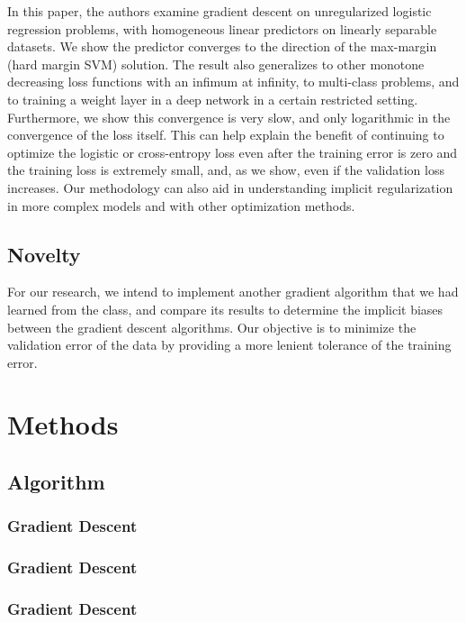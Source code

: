 In this paper, the authors examine gradient descent on unregularized logistic regression problems, with homogeneous linear predictors on linearly separable datasets. We show the predictor converges to the direction of the max-margin (hard margin SVM) solution. The result also generalizes to other monotone decreasing loss functions with an infimum at infinity, to multi-class problems, and to training a weight layer in a deep network in a certain restricted setting. Furthermore, we show this convergence is very slow, and only logarithmic in the convergence of the loss itself. This can help explain the benefit of continuing to optimize the logistic or cross-entropy loss even after the training error is zero and the training loss is extremely small, and, as we show, even if the validation loss increases. Our methodology can also aid in understanding implicit regularization in more complex models and with other optimization methods.

\section{Novelty}

For our research, we intend to implement another gradient algorithm that we had learned from the class, and compare its results to determine the implicit biases between the gradient descent algorithms. Our objective is to minimize the validation error of the data by providing a more lenient tolerance of the training error.

\chapter{Methods}

\section{Algorithm}

\subsection{Gradient Descent}

\subsection{Gradient Descent}

\subsection{Gradient Descent}

